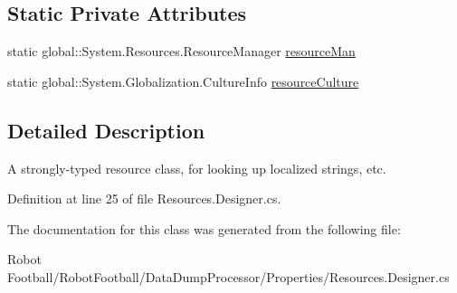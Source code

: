 \subsection*{Static Private Attributes}
\begin{CompactItemize}
\item 
\hypertarget{class_data_dump_processor_1_1_properties_1_1_resources_d28f8086a84501688b3c983120fd0704}{
static global::System.Resources.Resource\-Manager \hyperlink{class_data_dump_processor_1_1_properties_1_1_resources_d28f8086a84501688b3c983120fd0704}{resource\-Man}}
\label{class_data_dump_processor_1_1_properties_1_1_resources_d28f8086a84501688b3c983120fd0704}

\item 
\hypertarget{class_data_dump_processor_1_1_properties_1_1_resources_b6e1465f688497973864c58a358ce2c3}{
static global::System.Globalization.Culture\-Info \hyperlink{class_data_dump_processor_1_1_properties_1_1_resources_b6e1465f688497973864c58a358ce2c3}{resource\-Culture}}
\label{class_data_dump_processor_1_1_properties_1_1_resources_b6e1465f688497973864c58a358ce2c3}

\end{CompactItemize}


\subsection{Detailed Description}
A strongly-typed resource class, for looking up localized strings, etc. 



Definition at line 25 of file Resources.Designer.cs.

The documentation for this class was generated from the following file:\begin{CompactItemize}
\item 
Robot Football/Robot\-Football/Data\-Dump\-Processor/Properties/Resources.Designer.cs\end{CompactItemize}
